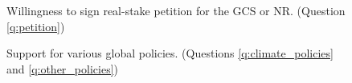 \begin{figure}[h!]
    \caption{Willingness to sign real-stake petition for the GCS or NR. (Question \ref{q:petition})}\label{fig:petition}
\end{figure}

\begin{figure}[h!] %
    \caption{Support for various global policies. (Questions \ref{q:climate_policies} and \ref{q:other_policies})}\label{fig:support_likert}
\end{figure}



